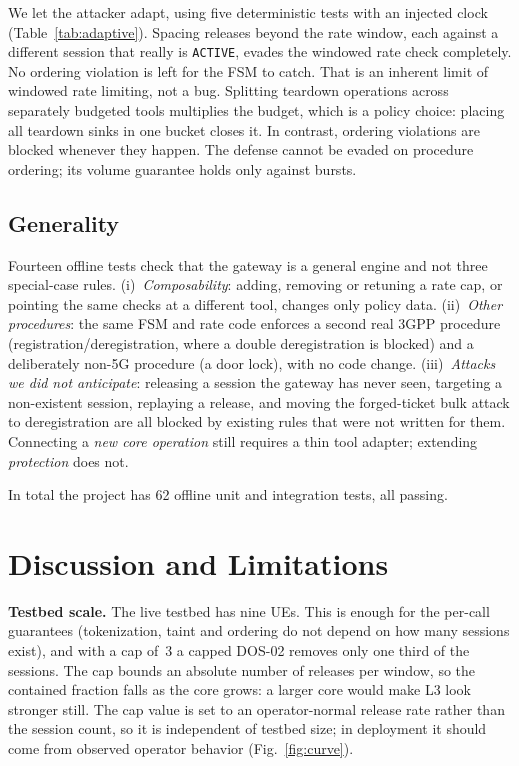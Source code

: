 \documentclass[conference]{IEEEtran}
\newcommand{\code}[1]{\texttt{\small #1}}
\begin{document}
We let the attacker adapt, using five deterministic tests with an injected clock
(Table~\ref{tab:adaptive}). Spacing releases beyond the rate window, each against a
different session that really is \code{ACTIVE}, evades the windowed rate check completely.
No ordering violation is left for the FSM to catch. That is an inherent limit of windowed
rate limiting, not a bug. Splitting teardown operations across separately budgeted tools
multiplies the budget, which is a policy choice: placing all teardown sinks in one bucket
closes it. In contrast, ordering violations are blocked whenever they happen. The defense
cannot be evaded on procedure ordering; its volume guarantee holds only against bursts.

\subsection{Generality}
Fourteen offline tests check that the gateway is a general engine and not three
special-case rules. (i)~\emph{Composability}: adding, removing or retuning a rate cap, or
pointing the same checks at a different tool, changes only policy data. (ii)~\emph{Other
procedures}: the same FSM and rate code enforces a second real 3GPP procedure
(registration/deregistration, where a double deregistration is blocked) and a deliberately
non-5G procedure (a door lock), with no code change. (iii)~\emph{Attacks we did not
anticipate}: releasing a session the gateway has never seen, targeting a non-existent
session, replaying a release, and moving the forged-ticket bulk attack to deregistration
are all blocked by existing rules that were not written for them. Connecting a \emph{new core
operation} still requires a thin tool adapter; extending \emph{protection} does not.

In total the project has 62 offline unit and integration tests, all passing.

\section{Discussion and Limitations}

\textbf{Testbed scale.} The live testbed has nine UEs. This is enough for the per-call
guarantees (tokenization, taint and ordering do not depend on how many sessions exist), and
with a cap of~3 a capped DOS-02 removes only one third of the sessions. The cap bounds an
absolute number of releases per window, so the contained fraction falls as the core grows: a
larger core would make L3 look stronger still. The cap value is set to an operator-normal
release rate rather than the session count, so it is independent of testbed size; in
deployment it should come from observed operator behavior (Fig.~\ref{fig:curve}).
\end{document}
